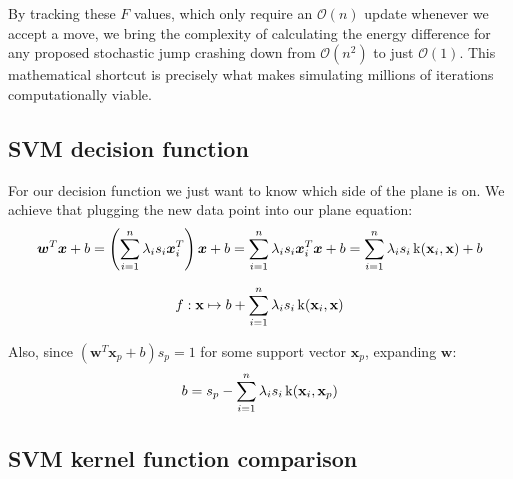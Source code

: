 By tracking these $F$ values, which only require an $\mathcal{O}(n)$ update whenever we accept a move, we bring the complexity of calculating the energy difference for any proposed stochastic jump crashing down from $\mathcal{O}(n^2)$ to just $\mathcal{O}(1)$. This mathematical shortcut is precisely what makes simulating millions of iterations computationally viable.










\subsection*{SVM decision function}
\label{sec:svm_decision}

For our decision function we just want to know which side of the plane is on. We achieve that plugging the new data point into our plane equation:
\begin{equation*}
    \bm w^T \bm{x} +b = \left( \sum_{i=1}^n \lambda_i s_i \bm{x}_i^T \right) \bm{x}+b
    =
    \sum_{i=1}^n \lambda_i s_i \bm{x}_i^T \bm{x}+b
    =
    \sum_{i=1}^n \lambda_i s_i \operatorname{k}(\textbf x_i, \textbf x)+b
\end{equation*}


\begin{equation*}
    f:\textbf  x\mapsto b + \sum_{i=1}^n\lambda_i s_i \operatorname k(\textbf x_i,\textbf x)
\end{equation*}

Also, since $(\bm w^T \bm x_p + b)s_p = 1$ for some support vector $\textbf{x} _p$, 
expanding $\bm w$:
\begin{equation*}
    b=s_p-\sum_{i=1}^n \lambda_i s_i \operatorname k(\textbf x_i, \textbf x_p)
\end{equation*}














\subsection*{SVM kernel function comparison}
\label{sec:svm_comparison}

